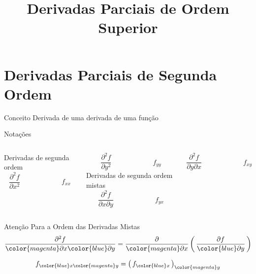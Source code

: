 \documentclass[fleqn,utf8,aspectratio=169,12pt,ignorenonframetext]{beamer}
\title{Derivadas Parciais de Ordem Superior}
\begin{document}
\addtitle

\section{Derivadas Parciais de Segunda Ordem}

\begin{frame}{Conceito}
  Derivada de uma derivada de uma função
\end{frame}

\begin{frame}{Notações}
\begin{columns}
  Derivadas de segunda ordem
  \[
    \frac{\partial^2 f}{\partial x^2} \qquad\qquad\qquad
    f_{xx}
  \]

  \vspace{\baselineskip}
  \[
    \frac{\partial^2 f}{\partial y^2} \qquad\qquad\qquad
    f_{yy}
  \]
  \pause
  Derivadas de segunda ordem mistas
  \[
    \frac{\partial^2 f}{\partial x \partial y} \qquad\qquad\qquad
    f_{yx}
  \]

  \vspace{\baselineskip}
  \[
    \frac{\partial^2 f}{\partial y \partial x} \qquad\qquad\qquad
    f_{xy}
  \]
\end{columns}
\end{frame}

\begin{frame}{Atenção Para a Ordem das Derivadas Mistas}
  \[
    \frac{\partial^2 f}{{\color{magenta} \partial x} {\color{blue} \partial y}}
    = \frac{\partial}{{\color{magenta} \partial x}}
      \left(\,\frac{\partial f}{{\color{blue} \partial y}}\,\right)
  \]

  \vspace{\baselineskip}
  \[
    f_{{\color{blue} x}{\color{magenta} y}} = \big(\,f_{\color{blue} x}\,\big)_{\color{magenta} y}
  \]
\end{frame}




\end{document}
